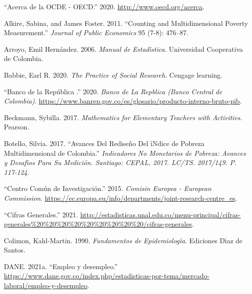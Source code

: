 \documentclass[
  11pt,
]{book}
\newlength{\cslhangindent}
\newlength{\cslentryspacingunit} %
\newenvironment{CSLReferences}[2] %
 {%
  \setlength{\parindent}{0pt}
  \ifodd #1
  \let\oldpar\par
  \def\par{\hangindent=\cslhangindent\oldpar}
  \fi
  \setlength{\parskip}{#2\cslentryspacingunit}
 }%
 {}
\begin{document}
\hypertarget{refs}{}
\begin{CSLReferences}{1}{0}
\leavevmode{}%
{``{Acerca de la OCDE - OECD}.''} 2020. \url{http://www.oecd.org/acerca}.

\leavevmode{}%
Alkire, Sabina, and James Foster. 2011. {``Counting and Multidimensional Poverty Measurement.''} \emph{Journal of Public Economics} 95 (7-8): 476--87.

\leavevmode{}%
Arroyo, Emil Hernández. 2006. \emph{Manual de Estad{ı́}stica}. Universidad Cooperativa de Colombia.

\leavevmode{}%
Babbie, Earl R. 2020. \emph{The Practice of Social Research}. Cengage learning.

\leavevmode{}%
{``{Banco de la Rep{ú\fi}blica }.''} 2020. \emph{Banco de La Rep{\ifmmode{}\fi}blica (Banco Central de Colombia)}. \url{https://www.banrep.gov.co/es/glosario/producto-interno-bruto-pib}.

\leavevmode{}%
Beckmann, Sybilla. 2017. \emph{Mathematics for Elementary Teachers with Activities}. Pearson.

\leavevmode{}%
Botello, Silvia. 2017. {``Avances Del Redise{ñ}o Del {ı́}Ndice de Pobreza Multidimensional de Colombia.''} \emph{Indicadores No Monetarios de Pobreza: Avances y Desaf{ı́}os Para Su Medici{ó}n. Santiago: CEPAL, 2017. LC/TS. 2017/149. P. 117-124}.

\leavevmode{}%
{``{Centro Com{ú}n de Investigaci{ó}n}.''} 2015. \emph{Comisi{\ifmmode{}\fi}n Europea - European Commission}. \url{https://ec.europa.eu/info/departments/joint-research-centre_es}.

\leavevmode{}%
{``Cifras Generales.''} 2021. \url{http://estadisticas.unal.edu.co/menu-principal/cifras-generales\%20\%20\%20\%20\%20\%20\%20\%20\%20/cifras-generales}.

\leavevmode{}%
Colimon, Kahl-Martin. 1990. \emph{Fundamentos de Epidemiolog{ı́}a}. Ediciones D{ı́}az de Santos.

\leavevmode{}%
DANE. 2021a. {``{Empleo y desempleo}.''} \url{https://www.dane.gov.co/index.php/estadisticas-por-tema/mercado-laboral/empleo-y-desempleo}.


\end{CSLReferences}
\end{document}
